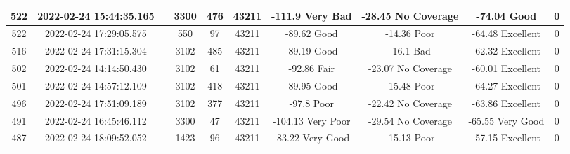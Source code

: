 \begin{longtable*}{|c|c|c|c|c|c|c|c|c|c|}
522&2022-02-24 15:44:35.165&&3300&476&43211& -111.9    Very Bad    & -28.45    No Coverage & -74.04    Good        & 0\\\hline
{}522&2022-02-24 17:29:05.575&&550&97&43211& -89.62    Good        & -14.36    Poor        & -64.48    Excellent   & 0\\\hline
{}516&2022-02-24 17:31:15.304&&3102&485&43211& -89.19    Good        & -16.1     Bad         & -62.32    Excellent   & 0\\\hline
{}502&2022-02-24 14:14:50.430&&3102&61&43211& -92.86    Fair        & -23.07    No Coverage & -60.01    Excellent   & 0\\\hline
{}501&2022-02-24 14:57:12.109&&3102&418&43211& -89.95    Good        & -15.48    Poor        & -64.27    Excellent   & 0\\\hline
{}496&2022-02-24 17:51:09.189&&3102&377&43211& -97.8     Poor        & -22.42    No Coverage & -63.86    Excellent   & 0\\\hline
{}491&2022-02-24 16:45:46.112&&3300&47&43211& -104.13   Very Poor   & -29.54    No Coverage & -65.55    Very Good   & 0\\\hline
{}487&2022-02-24 18:09:52.052&&1423&96&43211& -83.22    Very Good   & -15.13    Poor        & -57.15    Excellent   & 0\\\hline

\end{longtable*}
